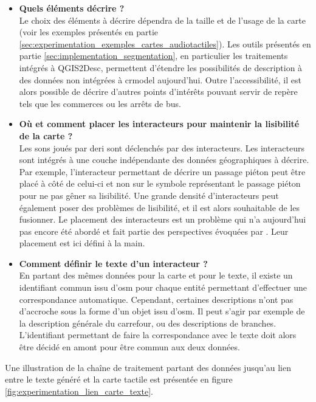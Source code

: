 \begin{itemize}
    \item \textbf{Quels éléments décrire ?} \\
    Le choix des éléments à décrire dépendra de la taille et de l'usage de la carte (voir les exemples présentés en partie \ref{sec:experimentation_exemples_cartes_audiotactiles}). Les outils présentés en partie \ref{sec:implementation_segmentation}, en particulier les traitements intégrés à QGIS2Desc, permettent d'étendre les possibilités de description à des données non intégrées à crmodel aujourd'hui. Outre l'accessibilité, il est alors possible de décrire d'autres points d'intérêts pouvant servir de repère tels que les commerces ou les arrêts de bus.
    \item \textbf{Où et comment placer les interacteurs pour maintenir la lisibilité de la carte ?} \\
    Les sons joués par \gls{deri} sont déclenchés par des interacteurs. Les interacteurs sont intégrés à une couche indépendante des données géographiques à décrire. Par exemple, l'interacteur permettant de décrire un passage piéton peut être placé à côté de celui-ci et non sur le symbole représentant le passage piéton pour ne pas gêner sa lisibilité. Une grande densité d'interacteurs peut également poser des problèmes de lisibilité, et il est alors souhaitable de les fusionner. Le placement des interacteurs est un problème qui n'a aujourd'hui pas encore été abordé et fait partie des perspectives évoquées par \citet{Jiang2023}. Leur placement est ici défini à la main.
    \item \textbf{Comment définir le texte d'un interacteur ?} \\
    En partant des mêmes données pour la carte et pour le texte, il existe un identifiant commun issu d'\gls{osm} pour chaque entité  permettant d'effectuer une correspondance automatique. Cependant, certaines descriptions n'ont pas d'accroche sous la forme d'un objet issu d'\gls{osm}. Il peut s'agir par exemple de la description générale du carrefour, ou des descriptions de branches. L'identifiant permettant de faire la correspondance avec le texte doit alors être décidé en amont pour être commun aux deux données.
\end{itemize}

\newpar{}

Une illustration de la chaîne de traitement partant des données jusqu'au lien entre le texte généré et la carte tactile est présentée en figure \ref{fig:experimentation_lien_carte_texte}.

